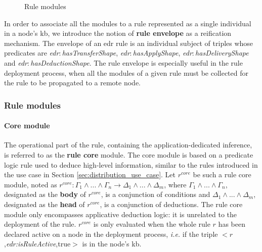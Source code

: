 \documentclass[sw]{iosart2x}
\newcommand{\namespace}[1]{\textit{#1$:$}}
\newcommand{\concept}[2]{\namespace{#1}\-\textit{#2}}
\newcommand{\triplet}[3]{$<$#1,\textit{#2},#3$>$}
\begin{document}
\begin{figure}
	\centering
	\caption{Rule modules}
	\label{fig:rule_modules}
	\scalebox{0.68}{
		
	}
\end{figure}

In order to associate all the modules to a rule represented as a single individual in a node's \gls{kb}, we introduce the notion of \textbf{rule envelope} as a reification mechanism. 
The envelope of an \gls{edr} rule is an individual subject of triples whose predicates are \concept{edr}{has\-Transfer\-Shape}, \concept{edr}{has\-Apply\-Shape}, \concept{edr}{has\-Delivery\-Shape} and \concept{edr}{has\-Deduction\-Shape}.
The rule envelope is especially useful in the rule deployment process, when all the modules of a given rule must be collected for the rule to be propagated to a remote node.

\subsubsection{Rule modules}
\label{subsubs:modules}

\paragraph{Core module}
The operational part of the rule, containing the application-dedicated inference, is referred to as the \textbf{rule core} module. 
The core module is based on a predicate logic rule used to deduce high-level information, similar to the rules introduced in the use case in Section \textsection \ref{sec:distribution_use_case}. 
Let $r^{core}$ be such a rule core module, noted as $r^{core}: \Gamma_1 \land ... \land \Gamma_n \rightarrow \Delta_1 \land ... \land \Delta_m$, where $\Gamma_1 \land ... \land \Gamma_n$, designated as the \textbf{body} of $r^{core}$, is a conjunction of conditions and $\Delta_1 \land ... \land \Delta_m$, designated as the \textbf{head} of $r^{core}$, is a conjunction of deductions.
The rule core module only encompasses applicative deduction logic: it is unrelated to the deployment of the rule.
$r^{core}$ is only evaluated when the whole rule $r$ has been declared active on a node in the deployment process, \textit{i.e.} if the triple \triplet{$r$}{edr:is\-Rule\-Active}{true} is in the node's \gls{kb}.
\end{document}
